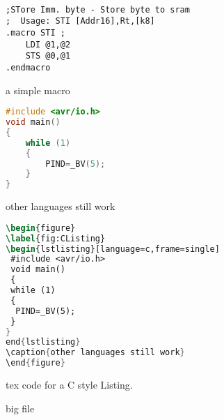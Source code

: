 \documentclass[titlepage]{article}
\begin{document}
\begin{figure}
\label{fig:simpleMacro}
\begin{lstlisting}[frame=none]

;STore Imm. byte - Store byte to sram
;  Usage: STI [Addr16],Rt,[k8]
.macro STI ;
	LDI @1,@2
	STS @0,@1
.endmacro
\end{lstlisting}

\caption{a simple macro}
\end{figure}


\begin{figure}
\label{fig:CListing}
\begin{lstlisting}[language=c,frame=single]
#include <avr/io.h>
void main()
{
	while (1)
	{
		PIND=_BV(5);
	}	
}
\end{lstlisting}
\caption{other languages still work}
\end{figure}


\begin{figure}
	\label{fig:ClistingSOurce}
		\begin{lstlisting}[language=tex]
\begin{figure}
\label{fig:CListing}
\begin{lstlisting}[language=c,frame=single]
 #include <avr/io.h>
 void main()
 {
 while (1)
 {
  PIND=_BV(5);
 }	
}
end{lstlisting}
\caption{other languages still work}
\end{figure}
\end{lstlisting}
\caption {tex code for a C style Listing.}
\end{figure}


\begin{figure}
	
 
 \caption{big file}
\end{figure}
\end{document}
